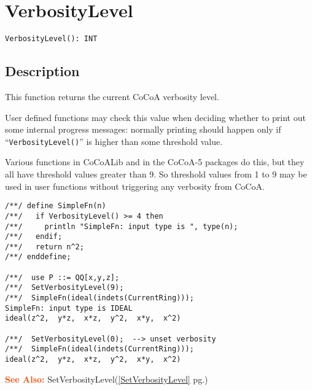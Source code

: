 \documentclass[a4paper]{mybook}
\newenvironment{command}{}{} %
\newcommand\SeeAlso{\par\textcolor{OrangeRed}{\textbf{\large See Also: }}}
\begin{document}
\section{VerbosityLevel}
\label{VerbosityLevel}
\begin{command} %


\begin{Verbatim}[label=syntax, rulecolor=\color{MidnightBlue},
frame=single]
VerbosityLevel(): INT
\end{Verbatim}


\subsection*{Description}

This function returns the current CoCoA verbosity level.
\par 
User defined functions may check this value when deciding whether to
print out some internal progress messages: normally printing should
happen only if ``\verb&VerbosityLevel()&'' is higher than some threshold value.
\par 
Various functions in CoCoALib and in the CoCoA-5 packages do this, but
they all have threshold values greater than 9.  So threshold values
from 1 to 9 may be used in user functions without triggering any
verbosity from CoCoA.
\begin{Verbatim}[label=example, rulecolor=\color{PineGreen}, frame=single]
/**/ define SimpleFn(n)
/**/   if VerbosityLevel() >= 4 then
/**/     println "SimpleFn: input type is ", type(n);
/**/   endif;
/**/   return n^2;
/**/ enddefine;

/**/  use P ::= QQ[x,y,z];
/**/  SetVerbosityLevel(9);
/**/  SimpleFn(ideal(indets(CurrentRing)));
SimpleFn: input type is IDEAL
ideal(z^2,  y*z,  x*z,  y^2,  x*y,  x^2)

/**/  SetVerbosityLevel(0);  --> unset verbosity
/**/  SimpleFn(ideal(indets(CurrentRing)));
ideal(z^2,  y*z,  x*z,  y^2,  x*y,  x^2)
\end{Verbatim}


\SeeAlso %
  SetVerbosityLevel(\ref{SetVerbosityLevel} pg.\pageref{SetVerbosityLevel})
\end{command} %
\end{document}
